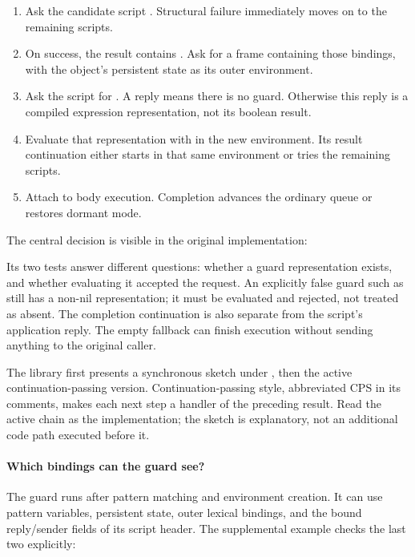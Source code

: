 \begin{enumerate}
  \item Ask the candidate script . Structural
  failure immediately moves on to the remaining scripts.
  \item On success, the result contains .
  Ask  for a frame containing those bindings, with the
  object's persistent state as its outer environment.
  \item Ask the script for . A  reply means
  there is no guard. Otherwise this reply is a compiled expression
  representation, not its boolean result.
  \item Evaluate that representation with \code{[:do ...]} in the new
  environment. Its result continuation either starts 
  in that same environment or tries the remaining scripts.
  \item Attach \code{[cont \_ [Me <= :end]]} to body execution.
  Completion advances the ordinary queue or restores dormant mode.
\end{enumerate}

The central decision is visible in the original implementation:


Its two  tests answer different questions: whether a guard
representation exists, and whether evaluating it accepted the request.
An explicitly false guard such as  still has a non-nil
representation; it must be evaluated and rejected, not treated as absent.
The completion continuation is also separate from the script's
application reply. The empty fallback can finish execution without
sending anything to the original caller.

The library first presents a synchronous sketch under
, then the active continuation-passing version.
Continuation-passing style, abbreviated CPS in its comments, makes
each next step a handler of the preceding result. Read the active
chain as the implementation; the sketch is explanatory, not an
additional code path executed before it.

\paragraph{Which bindings can the guard see?}
The guard runs after pattern matching and environment creation. It
can use pattern variables, persistent state, outer lexical bindings,
and the bound reply/sender fields of its script header. The supplemental
example checks the last two explicitly:

